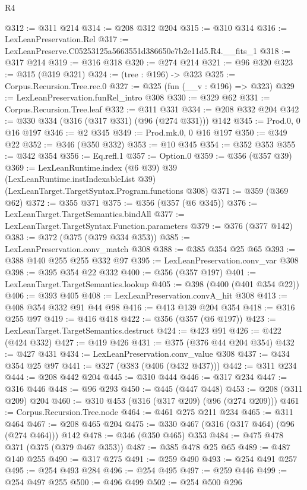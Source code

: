 \begin{lexlean}{R4}
\begin{coremodule}
@312 := @311 @214
@314 := @208 @312 @204
@315 := @310 @314
@316 := LexLeanPreservation.Rel
@317 := LexLeanPreserve.C05253125a5663551d386650e7b2e11d5.R4.__fits_1
@318 := @317 @214
@319 := @316 @318
@320 := @274 @214
@321 := @96 @320
@323 := @315 (@319 @321)
@324 := (tree : @196) -> @323
@325 := Corpus.Recursion.Tree.rec.{0}
@327 := @325 (fun (__v : @196) => @323)
@329 := LexLeanPreservation.funRel_intro @308
@330 := @329 @62
@331 := Corpus.Recursion.Tree.leaf
@332 := @311 @331
@334 := @208 @332 @204
@342 := @330 @334 (@316 (@317 @331) (@96 (@274 @331))) @142
@345 := Prod.{0, 0} @16 @197
@346 := @2 @345
@349 := Prod.mk.{0, 0} @16 @197
@350 := @349 @22
@352 := @346 (@350 @332)
@353 := @10 @345
@354 := @352 @353
@355 := @342 @354
@356 := Eq.refl.{1}
@357 := Option.{0}
@359 := @356 (@357 @39)
@369 := LexLeanRuntime.index
    (@6 @39)
    @39
    (LexLeanRuntime.instIndexableList @39)
    (LexLeanTarget.TargetSyntax.Program.functions @308)
@371 := @359 (@369 @62)
@372 := @355 @371
@375 := @356 (@357 (@6 @345))
@376 := LexLeanTarget.TargetSemantics.bindAll
@377 := LexLeanTarget.TargetSyntax.Function.parameters
@379 := @376 (@377 @142)
@383 := @372 (@375 (@379 @334 @353))
@385 := LexLeanPreservation.conv_match @308
@388 := @385 @354 @25 @65
@393 := @388 @140 @255 @255 @332 @97
@395 := LexLeanPreservation.conv_var @308
@398 := @395 @354 @22 @332
@400 := @356 (@357 @197)
@401 := LexLeanTarget.TargetSemantics.lookup
@405 := @398 (@400 (@401 @354 @22))
@406 := @393 @405
@408 := LexLeanPreservation.convA_hit @308
@413 := @408 @354 @332 @91 @44 @98
@416 := @413 @139 @204 @354
@418 := @316 @255 @97
@419 := @416 @418
@422 := @356 (@357 (@6 @197))
@423 := LexLeanTarget.TargetSemantics.destruct
@424 := @423 @91
@426 := @422 (@424 @332)
@427 := @419 @426
@431 := @375 (@376 @44 @204 @354)
@432 := @427 @431
@434 := LexLeanPreservation.conv_value @308
@437 := @434 @354 @25 @97
@441 := @327 (@383 (@406 (@432 @437)))
@442 := @311 @234
@444 := @208 @442 @204
@445 := @310 @444
@446 := @317 @234
@447 := @316 @446
@448 := @96 @293
@450 := @445 (@447 @448)
@453 := @208 (@311 @209) @204
@460 := @310 @453 (@316 (@317 @209) (@96 (@274 @209)))
@461 := Corpus.Recursion.Tree.node
@464 := @461 @275 @211 @234
@465 := @311 @464
@467 := @208 @465 @204
@475 := @330 @467 (@316 (@317 @464) (@96 (@274 @464))) @142
@478 := @346 (@350 @465) @353
@484 := @475 @478 @371 (@375 (@379 @467 @353))
@487 := @385 @478 @25 @65
@489 := @487 @140 @255
@490 := @317 @275
@491 := @259 @490
@493 := @254 @491 @257
@495 := @254 @493 @284
@496 := @254 @495
@497 := @259 @446
@499 := @254 @497 @255
@500 := @496 @499
@502 := @254 @500 @296

\end{coremodule}
\end{lexlean}

